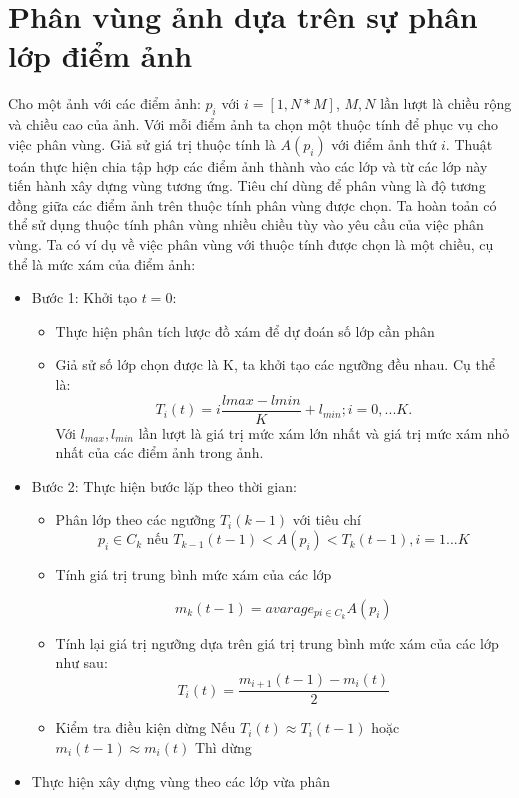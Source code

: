 \documentclass[12pt, oneside, a4]{book}
\begin{document}
\section{Phân vùng ảnh dựa trên sự phân lớp điểm ảnh}
Cho một ảnh với các điểm ảnh: $p_{i}$ với $i=[1,N*M]$, $M,N$ lần lượt là chiều rộng và chiều cao của ảnh. Với mỗi điểm ảnh ta chọn một thuộc tính để phục vụ cho việc phân vùng. Giả sử giá trị thuộc tính là $A(p_{i})$ với điểm ảnh thứ $i$. Thuật toán thực hiện chia tập hợp các điểm ảnh thành vào các lớp và từ các lớp này tiến hành xây dựng vùng tương ứng. Tiêu chí dùng để phân vùng là độ tương đồng giữa các điểm ảnh trên thuộc tính phân vùng được chọn. Ta hoàn toản có thể sử dụng thuộc tính phân vùng nhiều chiều tùy vào yêu cầu của việc phân vùng.
Ta có ví dụ về việc phân vùng với thuộc tính được chọn là một chiều, cụ thể là mức xám của điểm ảnh:
\begin{itemize}
\item Bước 1:
Khởi tạo $t=0$:
\begin{itemize}
\item Thực hiện phân tích lược đồ xám để dự đoán số lớp cần phân
\item Giả sử số lớp chọn được là K, ta khởi tạo các ngưỡng đều nhau. Cụ thể là:
\begin{equation*}
T_i(t)=i\dfrac{lmax-lmin}{K}+l_{min}; i=0,...K. 
\end{equation*}
Với $l_{max}, l_{min}$ lần lượt là giá trị mức xám lớn nhất và giá trị mức xám nhỏ nhất của các điểm ảnh trong ảnh.
\end{itemize}
\item Bước 2: Thực hiện bước lặp theo thời gian:
\begin{itemize}
\item Phân lớp theo các ngưỡng $T_i(k-1)$ với tiêu chí
\begin{equation*}
p_i\in C_k \textrm{ nếu }T_{k-1}(t-1)<A(p_i)<T_{k}(t-1), i=1...K
\end{equation*}
\item Tính giá trị trung bình mức xám của các lớp 

\begin{equation*}
m_k(t-1)= avarage_{pi\in C_k}A(p_i)
\end{equation*}
\item Tính lại giá trị ngưỡng dựa trên giá trị trung bình mức xám của các lớp như sau:
\begin{equation*}
T_i(t)=\dfrac{m_{i+1}(t-1)-m_{i}(t)}{2}
\end{equation*}
\item Kiểm tra điều kiện dừng
Nếu $T_i(t)\approx T_i(t-1)$ hoặc $m_{i}(t-1)\approx m_{i}(t)$ Thì dừng
\end{itemize}
\item Thực hiện xây dựng vùng theo các lớp vừa phân
\end{itemize}
\end{document}
